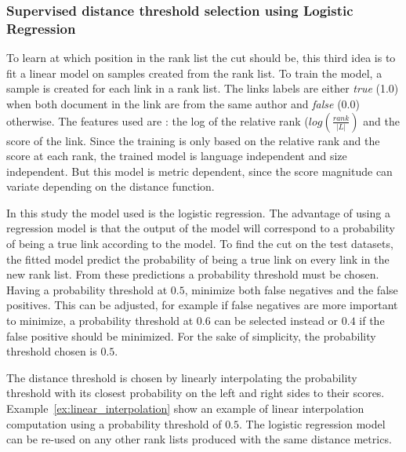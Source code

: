 \subsubsection{Supervised distance threshold selection using Logistic Regression}

To learn at which position in the rank list the cut should be, this third idea is to fit a linear model on samples created from the rank list.
To train the model, a sample is created for each link in a rank list.
The links labels are either \textit{true} (1.0) when both document in the link are from the same author and \textit{false} (0.0) otherwise.
The features used are : the log of the relative rank ($log(\frac{rank}{|L|})$ and the score of the link.
Since the training is only based on the relative rank and the score at each rank, the trained model is language independent and size independent.
But this model is metric dependent, since the score magnitude can variate depending on the distance function.

In this study the model used is the logistic regression.
The advantage of using a regression model is that the output of the model will correspond to a probability of being a true link according to the model.
To find the cut on the test datasets, the fitted model predict the probability of being a true link on every link in the new rank list.
From these predictions a probability threshold must be chosen.
Having a probability threshold at $0.5$, minimize both false negatives and the false positives.
This can be adjusted, for example if false negatives are more important to minimize, a probability threshold at $0.6$ can be selected instead or $0.4$ if the false positive should be minimized.
For the sake of simplicity, the probability threshold chosen is $0.5$.

The distance threshold is chosen by linearly interpolating the probability threshold with its closest probability on the left and right sides to their scores.
Example~\ref{ex:linear_interpolation} show an example of linear interpolation computation using a probability threshold of $0.5$.
The logistic regression model can be re-used on any other rank lists produced with the same distance metrics.

